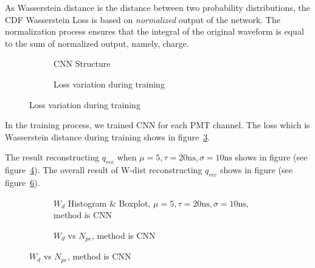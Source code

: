 As Wasserstein distance is the distance between two probability distributions, the CDF Wasserstein Loss is based on \emph{normalized} output of the network. The normalization process ensures that the integral of the original waveform is equal to the sum of normalized output, namely, charge. 

\begin{figure}[H]
\begin{minipage}[b]{.4\textwidth}
\begin{figure}[H]
    \begin{center}
    \begin{adjustbox}{width=0.6\textwidth}
        
    \end{adjustbox}
    \end{center}
    \caption{\label{fig:struct} CNN Structure}
\end{figure}
\end{minipage}
\begin{minipage}[b]{.6\textwidth}
\begin{figure}[H]
    \centering
    \resizebox{\textwidth}{!}{}
    \caption{\label{fig:loss} Loss variation during training}
\end{figure}
\end{minipage}
\end{figure}

In the training process, we trained CNN for each PMT channel. The loss which is Wasserstein distance during training shows in figure~\ref{fig:loss}. 

The result reconstructing $q_{rec}$ when $\mu=5, \tau=20\mathrm{ns}, \sigma=10\mathrm{ns}$ shows in figure (see figure~\ref{fig:cnn-hist}). The overall result of W-dist reconstructing $q_{rec}$ shows in figure (see figure~\ref{fig:cnn-npe}). 

\begin{figure}[H]
\begin{minipage}[t]{.5\textwidth}
\begin{figure}[H]
    \centering
    \resizebox{\textwidth}{!}{}
    \caption{\label{fig:cnn-hist} $W_{d}$ Histogram \& Boxplot, $\mu=5, \tau=20\mathrm{ns}, \sigma=10\mathrm{ns}$, method is CNN}
\end{figure}
\end{minipage}
\begin{minipage}[t]{.5\textwidth}
\begin{figure}[H]
    \centering
    \resizebox{\textwidth}{!}{}
    \caption{\label{fig:cnn-npe} $W_{d}$ vs $N_{pe}$, method is CNN}
\end{figure}
\end{minipage}
\end{figure}

